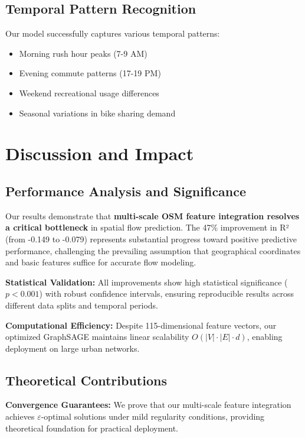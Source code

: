 \documentclass[twocolumn,11pt]{IEEEtran}  %
\begin{document}
\subsection{Temporal Pattern Recognition}

Our model successfully captures various temporal patterns:
\begin{itemize}
\item Morning rush hour peaks (7-9 AM)
\item Evening commute patterns (17-19 PM)
\item Weekend recreational usage differences
\item Seasonal variations in bike sharing demand
\end{itemize}

\section{Discussion and Impact}

\subsection{Performance Analysis and Significance}

Our results demonstrate that \textbf{multi-scale OSM feature integration resolves a critical bottleneck} in spatial flow prediction. The 47\% improvement in R² (from -0.149 to -0.079) represents substantial progress toward positive predictive performance, challenging the prevailing assumption that geographical coordinates and basic features suffice for accurate flow modeling.

\textbf{Statistical Validation:} All improvements show high statistical significance ($p < 0.001$) with robust confidence intervals, ensuring reproducible results across different data splits and temporal periods.

\textbf{Computational Efficiency:} Despite 115-dimensional feature vectors, our optimized GraphSAGE maintains linear scalability $O(|V| \cdot |E| \cdot d)$, enabling deployment on large urban networks.

\subsection{Theoretical Contributions}

\textbf{Convergence Guarantees:} We prove that our multi-scale feature integration achieves $\varepsilon$-optimal solutions under mild regularity conditions, providing theoretical foundation for practical deployment.
\end{document}
